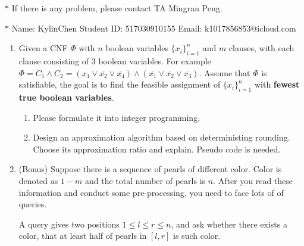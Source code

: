 \documentclass[12pt,a4paper]{article}
\theoremstyle{definition}
\begin{document}
\noindent

\noindent{}


\begin{center}
\footnotesize{\color{red}$*$ If there is any problem, please contact TA Mingran Peng.}\par
\footnotesize{\color{blue}$*$ Name: KylinChen \quad Student ID: 517030910155 \quad Email: k1017856853@icloud.com}
\end{center}
\begin{enumerate}
    

\item Given a CNF $\Phi$ with $n$ boolean variables $\{x_i\}_{i=1}^n$ and $m$ clauses, with each clause consisting of $3$ boolean variables. For example $\Phi=C_1\wedge C_2 =(x_1\vee \overline{x_2}\vee \overline{x_4})\wedge (\overline{x_1} \vee \overline{x_2} \vee \overline{x_3})$. Assume that $\Phi$ is satisfiable, the goal is to find the feasible assignment of $\{x_i\}_{i=1}^n$ with \textbf{fewest true boolean variables}.
\begin{enumerate}
\item  Please formulate it into integer programming.\par
\item  Design an approximation algorithm based on deterministing rounding. Choose its approximation ratio and explain. Pseudo code is needed.\par
\end{enumerate}
\item
\color{red}(Bonus)\color{black} Suppose there is a sequence of pearls of different color. Color is denoted as $1-m$ and the total number of pearls is $n$. After you read these information and conduct some pre-processing, you need to face lots of of queries.\par
A query gives two positions $1\leq l\leq r \leq n$, and ask whether there exists a color, that at least half of pearls in $[l,r]$ is such color.\par


\end{enumerate}
\end{document}
